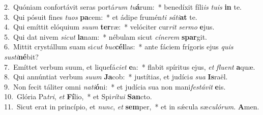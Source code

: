 {2.~}Quóniam confortávit seras portá\textit{rum} \textit{tu}\textbf{á}rum:~* benedíxit fíli\textit{is} \textit{tu}\textit{is} \textbf{in} te.\\
{3.~}Qui pósuit fines \textit{tu}\textit{os} \textbf{pa}cem:~* et ádipe frumén\textit{ti} \textit{sá}\textit{ti}\textbf{at} te.\\
{4.~}Qui emíttit elóquium \textit{su}\textit{um} \textbf{ter}ræ:~* velóciter cur\textit{rit} \textit{ser}\textit{mo} \textbf{e}jus.\\
{5.~}Qui dat nivem \textit{si}\textit{cut} \textbf{la}nam:~* nébulam sicut \textit{cí}\textit{ne}\textit{rem} \textbf{spar}git.\\
{6.~}Mittit crystállum suam si\textit{cut} \textit{buc}\textbf{cél}las:~* ante fáciem frígoris ejus \textit{quis} \textit{su}\textit{sti}\textbf{né}bit?\\
{7.~}Emíttet verbum suum, et liquefá\textit{ci}\textit{et} \textbf{e}a:~* flabit spíritus ejus, \textit{et} \textit{flu}\textit{ent} \textbf{a}quæ.\\
{8.~}Qui annúntiat verbum \textit{su}\textit{um} \textbf{Ja}cob:~* justítias, et judíci\textit{a} \textit{su}\textit{a} \textbf{Is}raël.\\
{9.~}Non fecit táliter omni \textit{na}\textit{ti}\textbf{ó}ni:~* et judícia sua non mani\textit{fe}\textit{stá}\textit{vit} \textbf{e}is.\\
{10.~}Glória Pa\textit{tri}, \textit{et} \textbf{Fí}lio,~* et Spi\textit{rí}\textit{tu}\textit{i} \textbf{San}cto.\\
{11.~}Sicut erat in princípio, et \textit{nunc}, \textit{et} \textbf{sem}per,~* et in sǽcula sæ\textit{cu}\textit{ló}\textit{rum}. \textbf{A}men.\\
